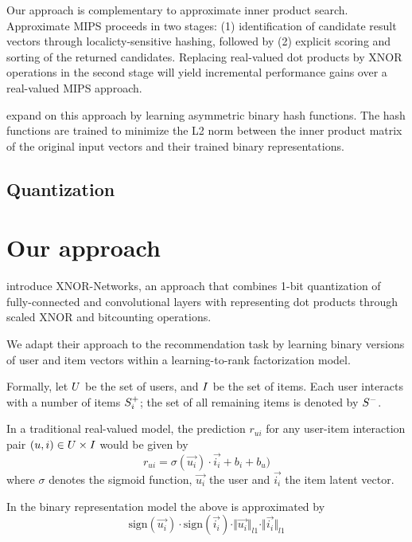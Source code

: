 \documentclass[sigconf]{acmart}
\begin{document}
Our approach is complementary to approximate inner product search. Approximate MIPS proceeds in two stages: (1) identification of candidate result vectors through localicty-sensitive hashing, followed by (2) explicit scoring and sorting of the returned candidates. Replacing real-valued dot products by XNOR operations in the second stage will yield incremental performance gains over a real-valued MIPS approach.

\cite{Shen_2015_ICCV} expand on this approach by learning asymmetric binary hash functions. The hash functions are trained to minimize the L2 norm between the inner product matrix of the original input vectors and their trained binary representations.
\subsection{Quantization}


\section{Our approach}
\cite{rastegari2016xnor} introduce XNOR-Networks, an approach that combines 1-bit quantization of fully-connected and convolutional layers with representing dot products through scaled XNOR and bitcounting operations.

We adapt their approach to the recommendation task by learning binary versions of user and item vectors within a learning-to-rank factorization model.

Formally, let $U$ be the set of users, and $I$ be the set of items. Each user interacts with a number of items $S_i^+$; the set of all remaining items is denoted by $S^-$.

In a traditional real-valued model, the prediction $r_{ui}$ for any user-item interaction pair $(u, i) \in U \times I$ would be given by
\begin{equation}
r_{ui} = \sigma(\vec{u_i}) \cdot \vec{i_i} + b_i + b_u)
\end{equation}
where $\sigma$ denotes the sigmoid function, $\vec{u_i}$ the user and $\vec{i_i}$ the item latent vector.

In the binary representation model the above is approximated by
\begin{equation}
\mathrm{sign}(\vec{u_i}) \cdot \mathrm{sign}(\vec{i_i}) \cdot \Vert\vec{u_i}\Vert_{l1} \cdot \Vert\vec{i_i}\Vert_{l1}
\end{equation}
\end{document}
